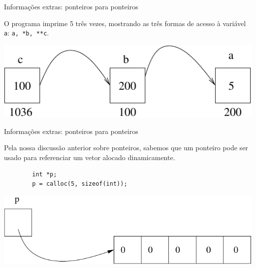 \documentclass[handout]{beamer}
\newcommand{\cod}[1]{\texttt{#1}}
\begin{document}
\begin{frame}[fragile]{Informações extras: ponteiros para ponteiros}

    O programa imprime 5 três vezes, mostrando as três formas de acesso à variável \cod{a}: \cod{a, *b, **c}.

    \begin{center}
        \includegraphics[scale=0.8]{pont2}
    \end{center}

\end{frame}

\begin{frame}[fragile]{Informações extras: ponteiros para ponteiros}

    Pela nossa discussão anterior sobre ponteiros, sabemos que um ponteiro pode ser usado para referenciar um vetor alocado dinamicamente.
    
    \begin{verbatim}
        int *p;
        p = calloc(5, sizeof(int));
    \end{verbatim}
    
    \begin{center}
        \includegraphics[scale=0.8]{pont3}
    \end{center}

\end{frame}
\end{document}
